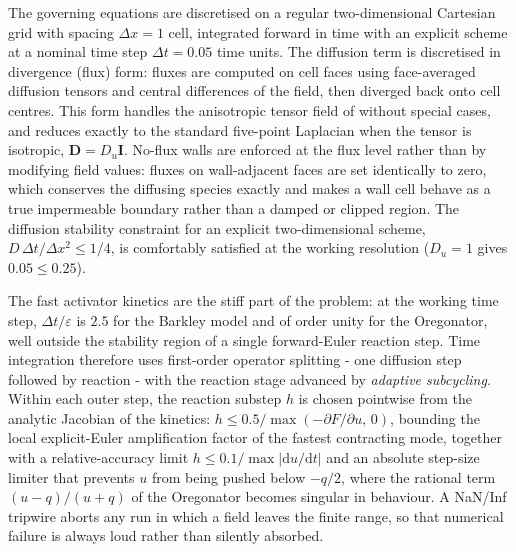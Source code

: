 The governing equations are discretised on a regular two-dimensional Cartesian grid with spacing $\Delta x = 1$ cell, integrated forward in time with an explicit scheme at a nominal time step $\Delta t = 0.05$ time units. 
The diffusion term is discretised in divergence (flux) form: fluxes are computed on cell faces using face-averaged diffusion tensors and central differences of the field, then diverged back onto cell centres. 
This form handles the anisotropic tensor field of  without special cases, and reduces exactly to the standard five-point Laplacian when the tensor is isotropic, $\mathbf{D} = D_{u}\mathbf{I}$. 
No-flux walls are enforced at the flux level rather than by modifying field values: fluxes on wall-adjacent faces are set identically to zero, which conserves the diffusing species exactly and makes a wall cell behave as a true impermeable boundary rather than a damped or clipped region. 
The diffusion stability constraint for an explicit two-dimensional scheme, $D\,\Delta t / \Delta x^{2} \leq 1/4$, is comfortably satisfied at the working resolution ($D_{u} = 1$ gives $0.05 \leq 0.25$).

The fast activator kinetics are the stiff part of the problem: at the working time step, $\Delta t/\varepsilon$ is $2.5$ for the Barkley model and of order unity for the Oregonator, well outside the stability region of a single forward-Euler reaction step. 
Time integration therefore uses first-order operator splitting - one diffusion step followed by reaction - with the reaction stage advanced by \emph{adaptive subcycling}. 
Within each outer step, the reaction substep $h$ is chosen pointwise from the analytic Jacobian of the kinetics: $h \leq 0.5 / \max(-\partial F/\partial u,\,0)$, bounding the local explicit-Euler amplification factor of the fastest contracting mode, together with a relative-accuracy limit $h \leq 0.1 / \max|\mathrm{d}u/\mathrm{d}t|$ and an absolute step-size limiter that prevents $u$ from being pushed below $-q/2$, where the rational term $(u-q)/(u+q)$ of the Oregonator becomes singular in behaviour. 
A NaN/Inf tripwire aborts any run in which a field leaves the finite range, so that numerical failure is always loud rather than silently absorbed.


